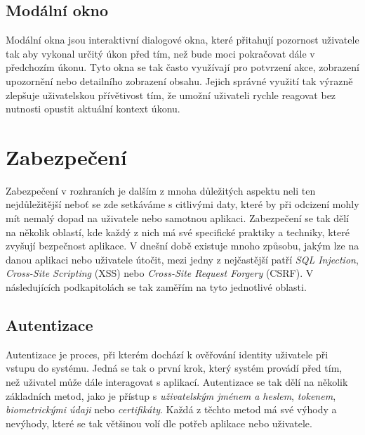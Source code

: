 \subsection*{Modální okno}
\label{subsec:admin-tags-modal}
Modální okna jsou interaktivní dialogové okna, které přitahují pozornost uživatele tak aby vykonal určitý úkon před tím, než bude moci pokračovat dále v předchozím úkonu. Tyto okna se tak často využívají pro potvrzení akce, zobrazení upozornění nebo detailního zobrazení obsahu. Jejich správné využití tak výrazně zlepšuje uživatelskou přívětivost tím, že umožní uživateli rychle reagovat bez nutnosti opustit aktuální kontext úkonu.

\section{Zabezpečení}
\label{sec:security}
Zabezpečení v rozhraních je dalším z mnoha důležitých aspektu neli ten nejdůležitější neboť se zde setkáváme s citlivými daty, které by při odcizení mohly mít nemalý dopad na uživatele nebo samotnou aplikaci. Zabezpečení se tak dělí na několik oblastí, kde každý z nich má své specifické praktiky a techniky, které zvyšují bezpečnost aplikace. V dnešní době existuje mnoho způsobu, jakým lze na danou aplikaci nebo uživatele útočit, mezi jedny z nejčastější patří \textit{SQL Injection}, \textit{Cross-Site Scripting} (XSS) nebo \textit{Cross-Site Request Forgery} (CSRF). V následujících podkapitolách se tak zaměřím na tyto jednotlivé oblasti.

\subsection{Autentizace}
\label{subsec:security-authentication}
Autentizace je proces, při kterém dochází k ověřování identity uživatele při vstupu do systému. Jedná se tak o první krok, který systém provádí před tím, než uživatel může dále interagovat s aplikací. Autentizace se tak dělí na několik základních metod, jako je přístup s \textit{uživatelským jménem a heslem}, \textit{tokenem}, \textit{biometrickými údaji} nebo \textit{certifikáty}. Každá z těchto metod má své výhody a nevýhody, které se tak většinou volí dle potřeb aplikace nebo uživatele.

